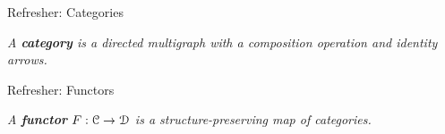   


\begin{frame}[t]{Refresher: Categories} %

  \par{} \textit{A \textbf{category} is a directed multigraph with a composition operation and identity arrows.}
  \vspace{\baselineskip}
  \par{}
  
\end{frame}

\begin{frame}[t]{Refresher: Functors} %

  \par{} \textit{A \textbf{functor} $F : \mathcal{C} \to \mathcal{D}$ is a structure-preserving map of categories.}
  \vspace{\baselineskip}
  \par{}
  
\end{frame}
